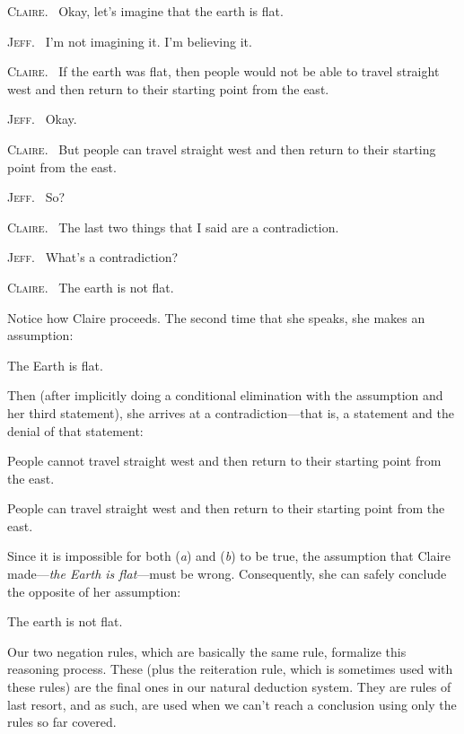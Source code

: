 {\textsc{\small Claire.}~ Okay, let’s imagine that the earth is flat.\vspace{1pt}

{\textsc{\small Jeff.}~ I’m not imagining it. I’m believing it.\vspace{1pt}

\hangindent=1cm {\textsc{\small Claire.}~ If the earth was flat, then people would not be able to travel straight west and then return to their starting point from the east.\vspace{1pt}

{\textsc{\small Jeff.}~ Okay.\vspace{1pt}

\hangindent=1cm {\textsc{\small Claire.}~ But people can travel straight west and then return to their starting point from the east.\vspace{1pt}

{\textsc{\small Jeff.}~ So?\vspace{1pt}

{\textsc{\small Claire.}~ The last two things that I said are a contradiction.\vspace{1pt}

{\textsc{\small Jeff.}~ What’s a contradiction?\vspace{1pt}

{\textsc{\small Claire.}~ The earth is not flat.
\medskip


\noindent Notice how Claire proceeds. The second time that she speaks, she makes an assumption:
\begin{ebullet}
	\item[] The Earth is flat.
\end{ebullet}
\noindent Then (after implicitly doing a conditional elimination with the assumption and her third statement), she arrives at a contradiction---that is, a statement and the denial of that statement:
\begin{ebullet}
	\item[\textit{a}:] People cannot travel straight west and then return to their starting point from the east. 
	\item[\textit{b}:] People can travel straight west and then return to their starting point from the east.
\end{ebullet}
Since it is impossible for both (\textit{a}) and (\textit{b}) to be true, the assumption that Claire made---\textit{the Earth is flat}---must be wrong. Consequently, she can safely conclude the opposite of her assumption: 
\begin{ebullet}
	\item[] The earth is not flat. 
\end{ebullet}
Our two negation rules, which are basically the same rule, formalize this reasoning process. These (plus the reiteration rule, which is sometimes used with these rules) are the final ones in our natural deduction system. They are rules of last resort, and as such, are used when we can't reach a conclusion using only the rules so far covered. 

}}}}}}}}}
